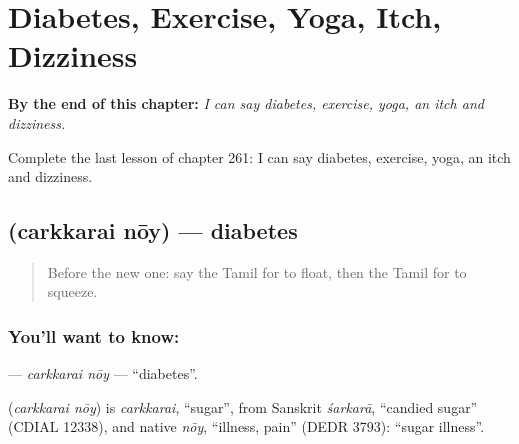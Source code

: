 
\chapter{Diabetes, Exercise, Yoga, Itch, Dizziness}
\label{ch:ta-diabetes-exercise-yoga-itch-dizziness}

\begin{chapteropening}
\textbf{By the end of this chapter:} \emph{I can say diabetes, exercise, yoga, an itch and dizziness.}

Complete the last lesson of chapter 261: I can say diabetes, exercise, yoga, an itch and dizziness.
\end{chapteropening}

\section[\texorpdfstring{\ta{சர்க்கரை} \ta{நோய்} (carkkarai nōy)}{சர்க்கரை நோய் (carkkarai nōy)}]{  (carkkarai nōy) — diabetes}

\label{lesson:TA-C261-carkkarai-noy}



\begin{quote}
Before the new one: say the Tamil for to float, then the Tamil for to squeeze.
\end{quote}

\subsection*{You'll want to know:  }
\textbf{ } — \emph{carkkarai nōy} — \textquotedblleft{}diabetes\textquotedblright{}.

\begin{cousinweb}
\textbf{ } (\emph{carkkarai nōy}) is \emph{carkkarai}, \textquotedblleft{}sugar\textquotedblright{}, from Sanskrit \emph{śarkarā}, \textquotedblleft{}candied sugar\textquotedblright{} (CDIAL 12338), and native \emph{nōy}, \textquotedblleft{}illness, pain\textquotedblright{} (DEDR 3793): \textquotedblleft{}sugar illness\textquotedblright{}.
\end{cousinweb}


